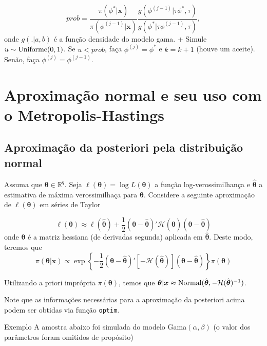 \documentclass[
  letterpaper,
  DIV=11,
  numbers=noendperiod]{scrreprt}
\theoremstyle{definition}
\theoremstyle{definition}
\theoremstyle{plain}
\theoremstyle{remark}
\begin{document}
\[prob = \frac{\pi(\phi^*|\boldsymbol{x})}{\pi(\phi^{(j-1)}|\boldsymbol{x})}\frac{g(\phi^{(j-1)}|\tau\phi^*,\tau)}{g(\phi^*|\tau\phi^{(j-1)},\tau)},\]
onde \(g(.|a,b)\) é a função densidade do modelo gama. + Simule
\(u\sim\hbox{Uniforme}(0,1)\). Se \(u<prob\), faça \(\phi^{(j)}=\phi^*\)
e \(k=k+1\) (houve um aceite). Senão, faça \(\phi^{(j)}=\phi^{(j-1)}\).


\chapter{Aproximação normal e seu uso com o
Metropolis-Hastings}\label{aproximauxe7uxe3o-normal-e-seu-uso-com-o-metropolis-hastings}

\section{Aproximação da posteriori pela distribuição
normal}\label{aproximauxe7uxe3o-da-posteriori-pela-distribuiuxe7uxe3o-normal}

Assuma que \(\boldsymbol{\theta}\in\mathbb{R}^q\). Seja
\(\ell(\boldsymbol{\theta})=\log L(\boldsymbol{\theta})\) a função
log-verossimilhança e \(\hat{\boldsymbol{\theta}}\) a estimativa de
máxima verossimilhaça para \(\boldsymbol{\theta}\). Considere a seguinte
aproximação de \(\ell(\boldsymbol{\theta})\) em séries de Taylor

\[\ell(\boldsymbol{\theta})\approx  \ell(\hat{\boldsymbol{\theta}})+\frac{1}{2}(\boldsymbol{\theta}-\hat{\boldsymbol{\theta}})'\mathcal{H}(\hat{\boldsymbol{\theta}})(\boldsymbol{\theta}-\hat{\boldsymbol{\theta}})\]
onde \(\boldsymbol{\theta}\) é a matriz hessiana (de derivadas segunda)
aplicada em \(\hat{\boldsymbol{\theta}}\). Deste modo, teremos que
\[\pi(\boldsymbol{\theta}|\boldsymbol{x})\propto \exp\left\{-\frac{1}{2}(\boldsymbol{\theta}-\hat{\boldsymbol{\theta}})'\left[-\mathcal{H}(\hat{\boldsymbol{\theta}})\right](\boldsymbol{\theta}-\hat{\boldsymbol{\theta}})\right\}\pi(\boldsymbol{\theta})\]

Utilizando a priori imprópria \(\pi(\boldsymbol{\theta})\), temos que
\(\boldsymbol{\theta}|\boldsymbol{x}\approx \hbox{Normal}(\hat{\boldsymbol{\theta}},-\mathcal{H}(\hat{\boldsymbol{\theta}})^{-1})\).

Note que as informações necessárias para a aproximação da posteriori
acima podem ser obtidas via função \texttt{optim}.

Exemplo A amostra abaixo foi simulada do modelo Gama\((\alpha,\beta)\)
(o valor dos parâmetros foram omitidos de propósito)
\end{document}
